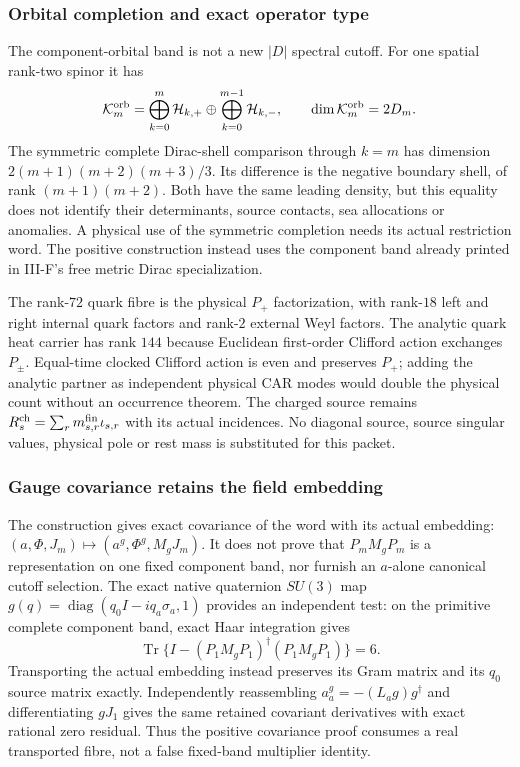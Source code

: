 \documentclass[12pt,a4paper]{article}
\begin{document}
\subsubsection{Orbital completion and exact operator type}
The component-orbital band is not a new $|D|$ spectral cutoff. For one spatial
rank-two spinor it has
\[
 \mathcal K_m^{\rm orb}
 =\bigoplus_{k=0}^m\mathcal H_{k,+}
 \oplus\bigoplus_{k=0}^{m-1}\mathcal H_{k,-},\qquad
 \dim\mathcal K_m^{\rm orb}=2D_m.
\]
The symmetric complete Dirac-shell comparison through $k=m$ has dimension
$2(m+1)(m+2)(m+3)/3$. Its difference is the negative boundary shell,
of rank $(m+1)(m+2)$. Both have the same leading density, but this equality
does not identify their determinants, source contacts, sea allocations or
anomalies. A physical use of the symmetric completion needs its actual
restriction word. The positive construction instead uses the component
band already printed in III-F's free metric Dirac specialization.

The rank-$72$ quark fibre is the physical $P_+$ factorization, with rank-$18$
left and right internal quark factors and rank-$2$ external Weyl factors.
The analytic quark heat carrier has rank $144$ because Euclidean first-order
Clifford action exchanges $P_\pm$. Equal-time clocked Clifford action is
even and preserves $P_+$; adding the analytic partner as independent physical
CAR modes would double the physical count without an occurrence theorem.
The charged source remains
$R_s^{\rm ch}=\sum_rm_{s,r}^{\rm fin}\iota_{s,r}$ with its actual incidences.
No diagonal source, source singular values, physical pole or rest mass is
substituted for this packet.


\subsubsection{Gauge covariance retains the field embedding}
The construction gives exact covariance of the word with its actual
embedding: $(a,\Phi,J_m)\mapsto(a^g,\Phi^g,M_gJ_m)$. It does not prove that
$P_mM_gP_m$ is a representation on one fixed component band, nor furnish
an $a$-alone canonical cutoff selection. The exact native quaternion
$SU(3)$ map $g(q)=\operatorname{diag}(q_0I-iq_a\sigma_a,1)$ provides an
independent test: on the primitive complete component band, exact Haar
integration gives
\[
 \operatorname{Tr}\{I-(P_1M_gP_1)^\dagger(P_1M_gP_1)\}=6.
\]
Transporting the actual embedding instead preserves its Gram matrix and
its $q_0$ source matrix exactly. Independently reassembling
$a_a^g=-(L_ag)g^\dagger$ and differentiating $gJ_1$ gives the same
retained covariant derivatives with exact rational zero residual. Thus the
positive covariance proof consumes a real transported fibre, not a false
fixed-band multiplier identity.
\end{document}
